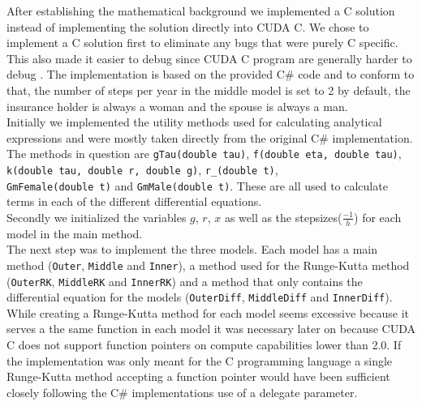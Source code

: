 
After establishing the mathematical background we implemented a C solution instead of implementing the solution directly into CUDA C. We chose to implement a C solution first to eliminate any bugs that were purely C specific. This also made it easier to debug since CUDA C program are generally harder to debug \cite{debu}. The implementation is based on the provided C\# code and to conform to that, the number of steps per year in the middle model is set to 2 by default, the insurance holder is always a woman and the spouse is always a man.\\

Initially we implemented the utility methods used for calculating analytical expressions and were mostly taken directly from the original C\# implementation. The methods in question are \texttt{gTau(double tau)}, \texttt{f(double eta, double tau)}, \texttt{k(double tau, double r, double g)}, \texttt{r\_(double t)}, \\ \texttt{GmFemale(double t)} and \texttt{GmMale(double t)}. These are all used to calculate terms in each of the different differential equations. \\

Secondly we initialized the variables $g$, $r$, $x$ as well as the stepsizes($\frac{-1}{h}$) for each model in the main method. \\

The next step was to implement the three models. Each model has a main method (\texttt{Outer}, \texttt{Middle} and \texttt{Inner}), a method used for the Runge-Kutta method (\texttt{OuterRK}, \texttt{MiddleRK} and \texttt{InnerRK}) and a method that only contains the differential equation for the models (\texttt{OuterDiff}, \texttt{MiddleDiff} and \texttt{InnerDiff}). While creating a Runge-Kutta method for each model seems excessive because it serves a the same function in each model it was necessary later on because CUDA C does not support function pointers on compute capabilities lower than 2.0. If the implementation was only meant for the C programming language a single Runge-Kutta method accepting a function pointer would have been sufficient closely following the C\# implementations use of a delegate parameter. \\

